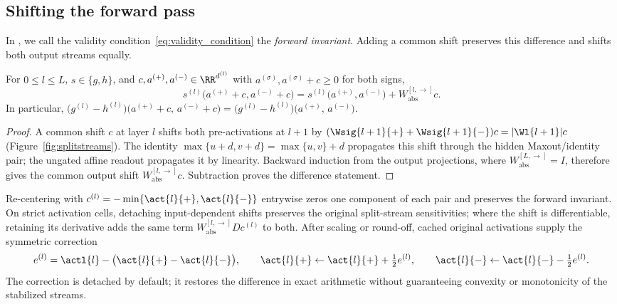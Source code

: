 \subsection{Shifting the forward pass}\label{subsec:forward_stabilization}

In \textcite{hiddenMono}, we call the validity condition~\eqref{eq:validity_condition} the \emph{forward invariant}. Adding a common shift preserves this difference and shifts both output streams equally.

\begin{theoremenv}\label{thm:shift_forward}
For $0\le l\le L$, $s\in\{g,h\}$, and $c,a^{(+)},a^{(-)}\in\RR^{d^{(l)}}$ with $a^{(\sigma)},a^{(\sigma)}+c\ge0$ for both signs,
\begin{equation}
s^{(l)}\bigl(a^{(+)}+c,a^{(-)}+c\bigr)
=s^{(l)}\bigl(a^{(+)},a^{(-)}\bigr)+W_{\mathrm{abs}}^{[l,\rightarrow]}c.
\label{eq:shift_forward}
\end{equation}
In particular, $\bigl(g^{(l)} - h^{(l)}\bigr)\bigl( a^{(+)} + c,\, a^{(-)} + c \bigr) = \bigl(g^{(l)} - h^{(l)}\bigr)\bigl( a^{(+)},\, a^{(-)} \bigr)$.\end{theoremenv}

\begin{proof}
A common shift $c$ at layer $l$ shifts both pre-activations at $l+1$ by $(\Wsig{l+1}{+}+\Wsig{l+1}{-})c=|\Wl{l+1}|c$ (Figure~\ref{fig:splitstreams}). The identity $\max\{u+d,v+d\}=\max\{u,v\}+d$ propagates this shift through the hidden Maxout/identity pair; the ungated affine readout propagates it by linearity. Backward induction from the output projections, where $W_{\mathrm{abs}}^{[L,\rightarrow]}=I$, therefore gives the common output shift $W_{\mathrm{abs}}^{[l,\rightarrow]}c$. Subtraction proves the difference statement.
\end{proof}

Re-centering with $c^{(l)}=-\min\{\act{l}{+},\act{l}{-}\}$ entrywise zeros one component of each pair and preserves the forward invariant. On strict activation cells, detaching input-dependent shifts preserves the original split-stream sensitivities; where the shift is differentiable, retaining its derivative adds the same term $W_{\mathrm{abs}}^{[l,\rightarrow]}Dc^{(l)}$ to both. After scaling or round-off, cached original activations supply the symmetric correction
\[
    e^{(l)}=\actl{l}-\bigl(\act{l}{+}-\act{l}{-}\bigr),
    \qquad
    \act{l}{+}\leftarrow\act{l}{+}+\tfrac12 e^{(l)},
    \qquad
    \act{l}{-}\leftarrow\act{l}{-}-\tfrac12 e^{(l)}.
\]
The correction is detached by default; it restores the difference in exact arithmetic without guaranteeing convexity or monotonicity of the stabilized streams.

